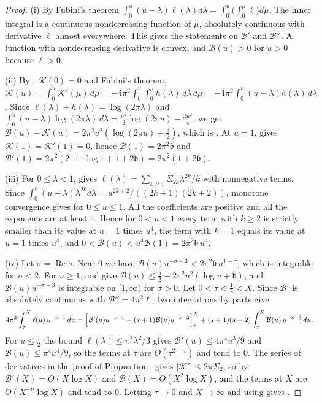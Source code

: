 \begin{proof}
\textup{(i)} By Fubini's theorem $\int_0^u(u-\lambda)\ell(\lambda)d\lambda=\int_0^u\bigl(\int_0^\mu\ell\bigr)d\mu$. The inner integral is a continuous nondecreasing function of $\mu$, absolutely continuous with derivative $\ell$ almost everywhere. This gives the statements on $\mathcal B'$ and $\mathcal B''$. A function with nondecreasing derivative is convex, and $\mathcal B(u)>0$ for $u>0$ because $\ell>0$.

\textup{(ii)} By , $\mathcal K(0)=0$ and Fubini's theorem, $\mathcal K(u)=\int_0^u\mathcal K'(\mu)\,d\mu=-4\pi^2\int_0^u\int_0^\mu h(\lambda)\,d\lambda\,d\mu=-4\pi^2\int_0^u(u-\lambda)h(\lambda)\,d\lambda$. Since $\ell(\lambda)+h(\lambda)=\log(2\pi\lambda)$ and $\int_0^u(u-\lambda)\log(2\pi\lambda)\,d\lambda=\frac{u^2}2\log(2\pi u)-\frac{3u^2}4$, we get $\mathcal B(u)-\mathcal K(u)=2\pi^2u^2(\log(2\pi u)-\frac32)$, which is . At $u=1$,  gives $\mathcal K(1)=\mathcal K'(1)=0$, hence $\mathcal B(1)=2\pi^2\mathfrak b$ and $\mathcal B'(1)=2\pi^2(2\cdot1\cdot\log1+1+2\mathfrak b)=2\pi^2(1+2\mathfrak b)$.

\textup{(iii)} For $0\le\lambda<1$,  gives $\ell(\lambda)=\sum_{k\ge1}\Sigma_{2k}\lambda^{2k}/k$ with nonnegative terms. Since $\int_0^u(u-\lambda)\lambda^{2k}d\lambda=u^{2k+2}/((2k+1)(2k+2))$, monotone convergence gives  for $0\le u\le1$. All the coefficients are positive and all the exponents are at least $4$. Hence for $0<u<1$ every term with $k\ge2$ is strictly smaller than its value at $u=1$ times $u^4$, the term with $k=1$ equals its value at $u=1$ times $u^4$, and $0<\mathcal B(u)<u^4\mathcal B(1)=2\pi^2\mathfrak b\,u^4$.

\textup{(iv)} Let $\sigma=\operatorname{Re}s$. Near $0$ we have $\mathcal B(u)u^{-\sigma-3}<2\pi^2\mathfrak b\,u^{1-\sigma}$, which is integrable for $\sigma<2$. For $u\ge1$,  and  give $\mathcal B(u)\le\frac52+2\pi^2u^2(\log u+\mathfrak b)$, and $\mathcal B(u)u^{-\sigma-3}$ is integrable on $[1,\infty)$ for $\sigma>0$. Let $0<\tau<\frac12<X$. Since $\mathcal B'$ is absolutely continuous with $\mathcal B''=4\pi^2\ell$, two integrations by parts give
\begin{equation}\label{eq:Bparts}
4\pi^2\int_\tau^X\ell(u)\,u^{-s-1}\,du=\Bigl[\mathcal B'(u)u^{-s-1}+(s+1)\mathcal B(u)u^{-s-2}\Bigr]_\tau^X+(s+1)(s+2)\int_\tau^X\mathcal B(u)\,u^{-s-3}\,du .
\end{equation}
For $u\le\frac12$ the bound $\ell(\lambda)\le\pi^2\lambda^2/3$ gives $\mathcal B'(u)\le4\pi^4u^3/9$ and $\mathcal B(u)\le\pi^4u^4/9$, so the terms at $\tau$ are $O(\tau^{2-\sigma})$ and tend to $0$. The series of derivatives in the proof of Proposition~ gives $|\mathcal K'|\le2\pi\Sigma_2$, so by  $\mathcal B'(X)=O(X\log X)$ and $\mathcal B(X)=O(X^2\log X)$, and the terms at $X$ are $O(X^{-\sigma}\log X)$ and tend to $0$. Letting $\tau\to0$ and $X\to\infty$ and using  gives .
\end{proof}

